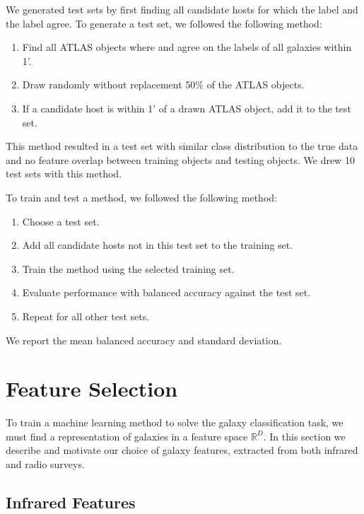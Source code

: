   We generated test sets by first finding all candidate hosts for which the
  \citeauthor{norris06} label and the \citeauthor{fan15} label agree. To
  generate a test set, we followed the following method:
  \begin{enumerate}
    \item Find all ATLAS objects where \citeauthor{norris06} and
    \citeauthor{fan15} agree on the labels of all galaxies within 1'.
    \item Draw randomly without replacement 50\% of the ATLAS objects.
    \item If a candidate host is within 1' of a drawn ATLAS object, add it to
    the test set.
  \end{enumerate}
  This method resulted in a test set with similar class distribution to the true
  data and no feature overlap between training objects and testing objects. We
  drew 10 test sets with this method.

  To train and test a method, we followed the following method:
  \begin{enumerate}
    \item Choose a test set.
    \item Add all candidate hosts not in this test set to the training set.
    \item Train the method using the selected training set.
    \item Evaluate performance with balanced accuracy against the test set.
    \item Repeat for all other test sets.
  \end{enumerate}
  We report the mean balanced accuracy and standard deviation.

\section{Feature Selection}
\label{sec:features}

  To train a machine learning method to solve the galaxy classification task,
  we must find a representation of galaxies in a feature space $\mathbb{R}^D$.
  In this section we describe and motivate our choice of galaxy features,
  extracted from both infrared and radio surveys.

  \subsection{Infrared Features}
  \label{sec:ir-features}

